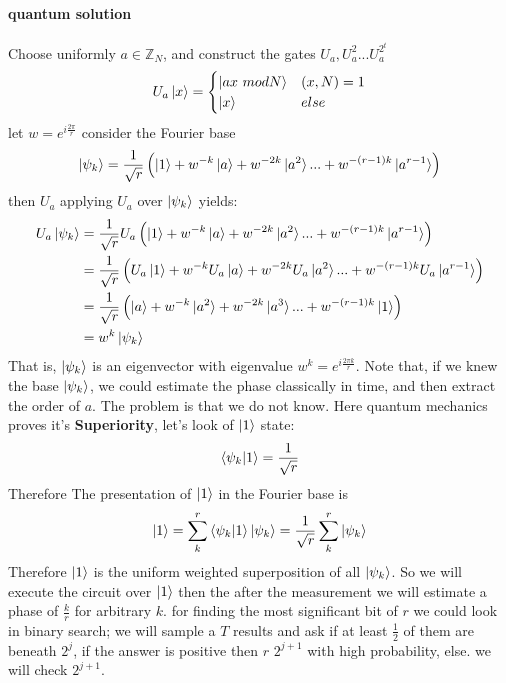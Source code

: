 \paragraph{quantum solution} Choose uniformly \( a \in \mathbb{Z}_N \), and construct the gates \( U_{a}, U_{a}^{2} ... U_{a}^{2^t}  \) \[ U_{a}\ket{x} = \begin{cases} \ket{ax \ mod N} & (x,N)=1 \\ \ket{x} & else  \end{cases} \] 
let \( w = e^{i\frac{2\pi}{r}}\)  consider the Fourier base \[ \ket{\psi_k} = \frac{1}{\sqrt{r}}\left( \ket{1} + w^{-k}\ket{a} + w^{-2k}\ket{a^2} ...  + w^{-(r-1)k}\ket{a^{r-1}}\right) \] then \( U_{a} \) applying \( U_a \) over \( \ket{\psi_k} \) yields: \[ \begin{split}
U_{a}\ket{\psi_k} & = \frac{1}{\sqrt{r}}U_{a}\left( \ket{1} + w^{-k}\ket{a} + w^{-2k}\ket{a^2} ...  + w^{-(r-1)k}\ket{a^{r-1}}\right)  \\ & = 
\frac{1}{\sqrt{r}}\left( U_{a}\ket{1} + w^{-k}U_{a}\ket{a} + w^{-2k}U_{a}\ket{a^2} ...  + w^{-(r-1)k}U_{a}\ket{a^{r-1}}\right) \\ & = \frac{1}{\sqrt{r}}\left( \ket{a} + w^{-k}\ket{a^2} + w^{-2k}\ket{a^3} ...  + w^{-(r-1)k}\ket{1}\right)\\ & = w^{k}\ket{\psi_k}  \end{split} \] That is, \( \ket{\psi_k} \) is an eigenvector with eigenvalue \( w^{k}=e^{i\frac{2\pi k}{r}} \). Note that, if we knew the base \( \ket{\psi_k} \), we could estimate the phase classically in  time, and then extract the order of \(a\). The problem is that we do not know. Here quantum mechanics proves it's \textbf{Superiority}, let's look of \( \ket{1} \) state: \[ \braket{\psi_{k}|1} = \frac{1}{\sqrt{r}} \]Therefore The presentation of  \( \ket{1} \) in the Fourier base is \[ \ket{1} = \sum_{k}^{r} {\braket{\psi_{k}|1}\ket{\psi_{k}}} = \frac{1}{\sqrt{r}}\sum_{k}^{r} {\ket{\psi_{k}}} \]Therefore \( \ket{1} \) is the uniform weighted superposition of all \( \ket{\psi_k} \). So we will execute the circuit over \( \ket{1} \) then the after the measurement we will estimate a phase of \( \frac{k}{r} \) for arbitrary \(k\). for finding the most significant bit of \(r\) we could look in binary search; we will sample a \(T\) results and ask if at least \(\frac{1}{2}\) of them are beneath \(2^j\), if the answer is positive then \(r\) \le \(2^{j+1}\) with high probability, else. we will check \(2^{j+1} \).        



